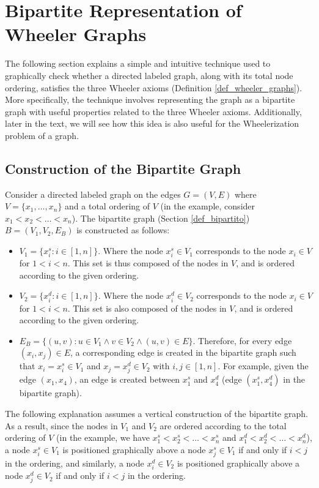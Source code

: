 \section{Bipartite Representation of Wheeler Graphs} \label{rapp_bipartita}
\endgroup
The following section explains a simple and intuitive technique used to graphically check whether a directed labeled graph, along with its total node ordering, satisfies the three Wheeler axioms (Definition \ref{def_wheeler_graphs}). More specifically, the technique involves representing the graph as a bipartite graph with useful properties related to the three Wheeler axioms. Additionally, later in the text, we will see how this idea is also useful for the Wheelerization problem of a graph.

\subsection{Construction of the Bipartite Graph}
Consider a directed labeled graph on the edges $G=(V,E)$ where $V=\{x_1,\dots,x_n\}$ and a total ordering of $V$ (in the example, consider $x_1<x_2<\dots<x_n$). The bipartite graph (Section \ref{def_bipartito}) $B=(V_1,V_2,E_B)$ is constructed as follows:

\begin{itemize}
    \item $V_1=\{x_i^s : i \in [1, n]\}$. Where the node $x_i^s \in V_1$ corresponds to the node $x_i \in V$ for $1 < i < n$. This set is thus composed of the nodes in $V$, and is ordered according to the given ordering.
    \item $V_2=\{x_i^d : i \in [1, n]\}$. Where the node $x_i^d \in V_2$ corresponds to the node $x_i \in V$ for $1 < i < n$. This set is also composed of the nodes in $V$, and is ordered according to the given ordering.
    \item $E_B=\{(u, v) : u \in V_1 \wedge v \in V_2 \wedge (u,v) \in E\}$. Therefore, for every edge $(x_i,x_j) \in E$, a corresponding edge is created in the bipartite graph such that $x_i = x_i^s \in V_1$ and $x_j=x_j^d \in V_2$ with $i, j \in [1, n]$. For example, given the edge $(x_1, x_4)$, an edge is created between $x_1^s$ and $x_4^d$ (edge $(x_1^s,x_4^d)$ in the bipartite graph).
\end{itemize}

The following explanation assumes a vertical construction of the bipartite graph. As a result, since the nodes in $V_1$ and $V_2$ are ordered according to the total ordering of $V$ (in the example, we have $x_1^s<x_2^s<\dots<x_n^s$ and $x_1^d<x_2^d<\dots<x_n^d$), a node $x_i^s \in V_1$ is positioned graphically above a node $x_j^s \in V_1$ if and only if $i < j$ in the ordering, and similarly, a node $x_i^d \in V_2$ is positioned graphically above a node $x_j^d \in V_2$ if and only if $i < j$ in the ordering.

